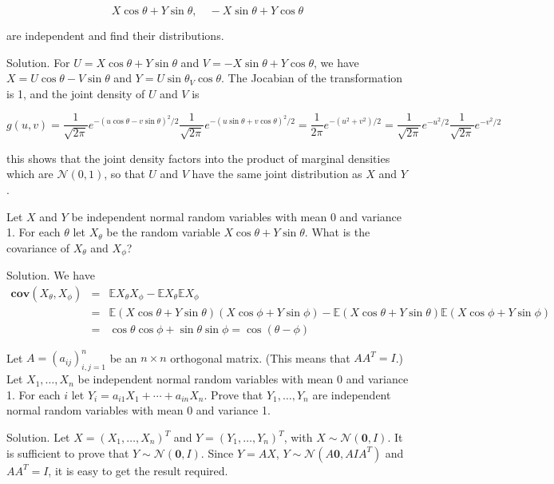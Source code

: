 \begin{equation}
X\cos\theta+Y\sin\theta, \quad -X\sin\theta+Y\cos\theta
\end{equation}

are independent and find their distributions.



Solution. For $U=X\cos\theta+Y\sin\theta$ and $V= -X\sin\theta+Y\cos\theta$, we have $X=U\cos\theta-V\sin\theta$ and $Y=U\sin\theta_V\cos\theta$. The Jocabian of the transformation is 1, and the joint density of $U$ and $V$ is

\begin{equation}
g(u,v)=\frac{1}{\sqrt{2\pi}}e^{-(u\cos\theta-v\sin\theta)^2/2} \frac{1}{\sqrt{2\pi}}e^{-(u\sin\theta+v\cos\theta)^2/2} = \frac{1}{2\pi}e^{-(u^2+v^2)/2} = \frac{1}{\sqrt{2\pi}}e^{-u^2/2} \frac{1}{\sqrt{2\pi}}e^{-v^2/2}
\end{equation}

this shows that the joint density factors into the product of marginal densities which are $\mathcal{N}(0,1)$, so that $U$ and $V$ have the same joint distribution as $X$ and $Y$.


\item Let $X$ and $Y$ be independent normal random variables with mean 0 and variance 1. For each $\theta$ let $X_\theta$ be the random variable $X\cos\theta+Y\sin\theta$. What is the covariance of $X_\theta$ and $X_\phi$?



Solution. We have
\begin{eqnarray}
\mathbf{cov}(X_\theta, X_\phi) & = & \mathbb{E}X_\theta X_\phi - \mathbb{E}X_\theta \mathbb{E}X_\phi \nonumber\\
& = & \mathbb{E}(X\cos\theta+Y\sin\theta)(X\cos\phi+Y\sin\phi) - \mathbb{E}(X\cos\theta+Y\sin\theta)\mathbb{E}(X\cos\phi+Y\sin\phi) \nonumber\\
& = & \cos\theta\cos\phi + \sin\theta\sin\phi =\cos(\theta-\phi)
\end{eqnarray}


\item Let $A=(a_{ij})^n_{i,j=1}$ be an $n\times n$ orthogonal matrix. (This means that $AA^T=I$.) Let $X_1,\dots,X_n$ be independent normal random variables with mean 0 and variance 1. For each $i$ let $Y_i=a_{i1}X_1 + \cdots + a_{in}X_n$. Prove that $Y_1,\dots, Y_n$ are independent normal random variables with mean 0 and variance 1.



Solution. Let $X=(X_1,\dots,X_n)^T$ and $Y=(Y_1,\dots,Y_n)^T$, with $X\sim\mathcal{N}(\mathbf{0},I)$. It is sufficient to prove that $Y\sim\mathcal{N}(\mathbf{0},I)$. Since $Y=AX$, $Y\sim\mathcal{N}(A\mathbf{0},AIA^T)$ and $AA^T=I$, it is easy to get the result required.



